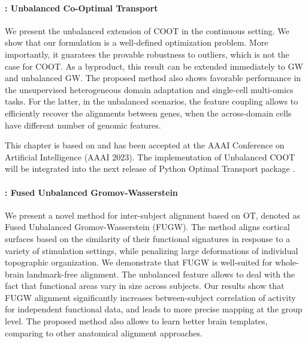 \paragraph{: Unbalanced Co-Optimal Transport}

We present the unbalanced extension of COOT in the continuous setting.
We show that our formulation is a well-defined optimization problem.
More importantly, it guaratees the provable robustness to outliers, which is not the case for COOT.
As a byproduct, this result can be extended immediately to GW and unbalanced GW.
The proposed method also shows favorable performance in
the unsupervised heterogeneous domain adaptation and single-cell multi-omics tasks.
For the latter, in the unbalanced scenarios, the feature coupling allows to efficiently recover
the alignments between genes, when the across-domain cells have
different number of genomic features.

This chapter is based on \citep{Tran23} and has been accepted at the
AAAI Conference on Artificial Intelligence (AAAI 2023). The implementation of
Unbalanced COOT will be
integrated into the next release of Python Optimal Transport package \citep{Flamary21}.


\paragraph{: Fused Unbalanced Gromov-Wasserstein}

We present a novel method for inter-subject alignment based on OT,
denoted as Fused Unbalanced Gromov-Wasserstein (FUGW). The method aligns cortical surfaces based
on the similarity of their functional signatures in response to a variety of stimulation settings,
while penalizing large deformations of individual topographic organization. We demonstrate that
FUGW is well-suited for whole-brain landmark-free alignment. The unbalanced feature allows
to deal with the fact that functional areas vary in size across subjects. Our results show that
FUGW alignment significantly increases between-subject correlation of activity for independent
functional data, and leads to more precise mapping at the group level.
The proposed method also allows to learn better brain templates, comparing to other anatomical
alignment approaches.

